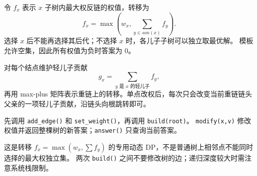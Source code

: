 令 $f_x$ 表示 $x$ 子树内最大权反链的权值，转移为
\[
  f_x=\max\left(w_x,\sum_{y\in son(x)}f_y\right).
\]
选择 $x$ 后不能再选择其后代；不选择 $x$ 时，各儿子子树可以独立取最优解。
模板允许空集，因此所有权值为负时答案为 $0$。

对每个结点维护轻儿子贡献
\[
  g_x=\sum_{y\text{ 是 }x\text{ 的轻儿子}}f_y,
\]
再用 max-plus 矩阵表示重链上的转移。单点改权后，每次只会改变当前重链链头父亲的一项轻儿子贡献，沿链头向根跳转即可。

先调用 \texttt{add\_edge()} 和 \texttt{set\_weight()}，再调用 \texttt{build(root)}。
\texttt{modify(x,v)} 修改权值并返回整棵树的新答案；\texttt{answer()} 只查询当前答案。

\begin{icpcwarning}[适用的 DP]
  这是转移 $f_x=\max(w_x,\sum f_y)$ 的专用动态 DP，不是普通树上相邻点不能同时选择的最大权独立集。
  两次 \texttt{build()} 之间不要修改树的边；递归深度较大时需注意系统栈限制。
\end{icpcwarning}
